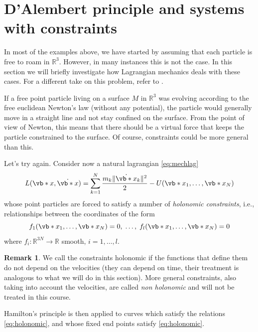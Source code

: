 \documentclass[english,fontsize=11pt,paper=b5]{scrbook}
\theoremstyle{definition}
\newtheorem{remark}{Remark}[chapter]
\begin{document}
    \section{D'Alembert principle and systems with constraints}\label{sec:LagrangeConstraints}

    In most of the examples above, we have started by assuming that each particle is free to roam in $\mathbb{R}^3$.
    However, in many instances this is not the case.
    In this section we will briefly investigate how Lagrangian mechanics deals with these cases. For a different take on this problem, refer to \cite[Chapter 21]{book:arnold}.

    If a free point particle living on a surface $M$ in $\mathbb{R}^3$ was evolving according to the free euclidean Newton's law (without any potential), the particle would generally move in a straight line and not stay confined on the surface.
    From the point of view of Newton, this means that there should be a virtual force that keeps the particle constrained to the surface. Of course, constraints could be more general than this.

    Let's try again. Consider now a natural lagrangian \eqref{eq:mechlag}
    \begin{equation}
      L(\vb*{x}, \dot{\vb*{x}}) = \sum_{k=1}^N \frac{m_k \|\dot{\vb*{x}}_k\|^2}{2} - U(\vb*{x}_1, \ldots, \vb*{x}_N)
    \end{equation}
    whose point particles are forced to satisfy a number of \emph{holonomic constraints}, i.e., relationships between the coordinates of the form
    \begin{equation}\label{eq:holonomic}
      f_1(\vb*{x}_1, \ldots,\vb*{x}_N) = 0, \;\ldots,\; f_l(\vb*{x}_1, \ldots,\vb*{x}_N) = 0
    \end{equation}
    where $f_i : \mathbb{R}^{3N}\to\mathbb{R}$ smooth, $i=1,\ldots,l$.

    \begin{remark}
      We call the constraints holonomic if the functions that define them do not depend on the velocities (they can depend on time, their treatment is analogous to what we will do in this section). More general constraints, also taking into account the velocities, are called \emph{non holonomic} and will not be treated in this course.
    \end{remark}

    Hamilton's principle is then applied to curves which satisfy the relations \eqref{eq:holonomic}, and whose fixed end points satisfy \eqref{eq:holonomic}.
\end{document}
